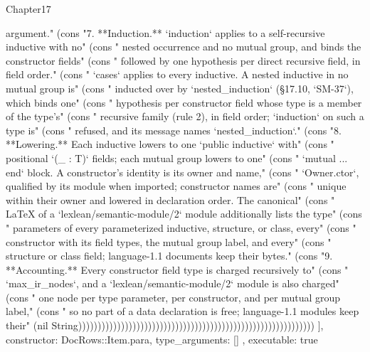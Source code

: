 \begin{lexlean}{Chapter17}
\begin{semanticmodule}
{{argument." (cons "7. **Induction.** `induction` applies to a self-recursive inductive with no" (cons "   nested occurrence and no mutual group, and binds the constructor fields" (cons "   followed by one hypothesis per direct recursive field, in field order." (cons "   `cases` applies to every inductive. A nested inductive in no mutual group is" (cons "   inducted over by `nested_induction` (§17.10, `SM-37`), which binds one" (cons "   hypothesis per constructor field whose type is a member of the type's" (cons "   recursive family (rule 2), in field order; `induction` on such a type is" (cons "   refused, and its message names `nested_induction`." (cons "8. **Lowering.** Each inductive lowers to one `public inductive` with" (cons "   positional `(_ : T)` fields; each mutual group lowers to one" (cons "   `mutual ... end` block. A constructor's identity is its owner and name," (cons "   `Owner.ctor`, qualified by its module when imported; constructor names are" (cons "   unique within their owner and lowered in declaration order. The canonical" (cons "   LaTeX of a `lexlean/semantic-module/2` module additionally lists the type" (cons "   parameters of every parameterized inductive, structure, or class, every" (cons "   constructor with its field types, the mutual group label, and every" (cons "   structure or class field; language-1.1 documents keep their bytes." (cons "9. **Accounting.** Every constructor field type is charged recursively to" (cons "   `max_ir_nodes`, and a `lexlean/semantic-module/2` module is also charged" (cons "   one node per type parameter, per constructor, and per mutual group label," (cons "   so no part of a data declaration is free; language-1.1 modules keep their" (nil String)))))))))))))))))))))))))))))))))))))))))))))))))))))))))))))
    ],
    constructor: DocRows::Item.para,
    type_arguments: []
  },
  executable: true
}


\end{semanticmodule}
\end{lexlean}
